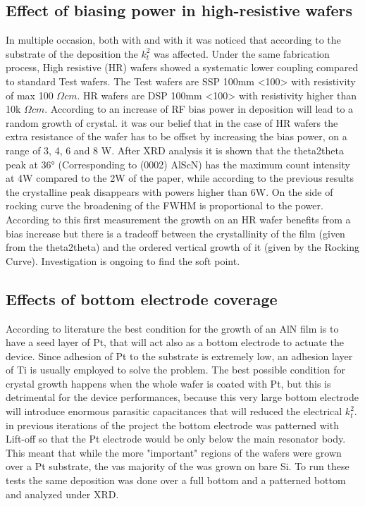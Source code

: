 \subsection{Effect of biasing power in high-resistive wafers}
\label{ssec:HR}
In multiple occasion, both with  and with  it was noticed that according to the substrate of the deposition the $k_t^2$ was affected. Under the same fabrication process, High resistive (HR) wafers showed a systematic lower coupling compared to standard Test wafers. The Test wafers are SSP 100mm <100> with resistivity of  max 100 $\Omega cm$. HR wafers are DSP 100mm <100> with resistivity higher than 10k $\Omega cm$. According to \cite{sandu_impact_2020} an increase of RF bias power in deposition will lead to a random growth of crystal. it was our belief that in the case of HR wafers the extra resistance of the wafer has to be offset by increasing the bias power, on a range of 3, 4, 6 and 8 W. After XRD analysis it is shown that the theta2theta peak at 36° (Corresponding to (0002) AlScN) has the maximum count intensity at 4W compared to the 2W of the paper, while according to the previous results the crystalline peak disappears with powers higher than 6W. On the side of rocking curve the broadening of the FWHM is proportional to the power. According to this first measurement the growth on an HR wafer benefits from a bias increase but there is a tradeoff between the crystallinity of the film (given from the theta2theta) and the ordered vertical growth of it (given by the Rocking Curve). Investigation is ongoing to find the soft point.

\subsection{Effects of bottom electrode coverage}
\label{ssec:bottom}
According to literature \cite{howell_effect_2019} \cite{xiong_influence_2010} the best condition for the growth of an AlN film is to have a seed layer of Pt, that will act also as a bottom electrode to actuate the device. Since adhesion of Pt to the substrate is extremely low, an adhesion layer of Ti is usually employed to solve the problem. The best possible condition for crystal growth happens when the whole wafer is coated with Pt, but this is detrimental for the device performances, because this very large bottom electrode will introduce enormous parasitic capacitances that will reduced the electrical $k_t^2$. in previous iterations of the project the bottom electrode was patterned with Lift-off so that the Pt electrode would be only below the main resonator body. This meant that while the more "important" regions of the wafers were grown over a Pt substrate, the vas majority of the  was grown on bare Si. To run these tests the same deposition was done over a full bottom and a patterned bottom and analyzed under XRD.  


